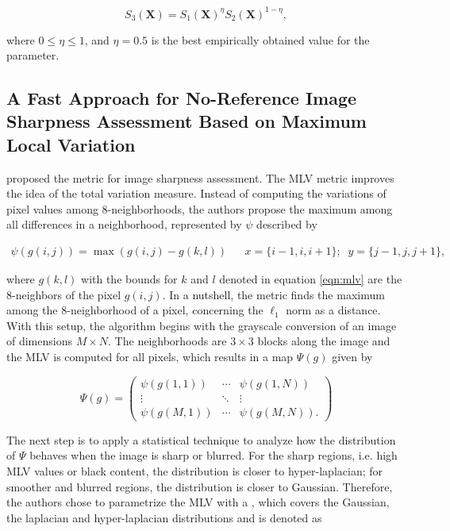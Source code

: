 \begin{equation}
\label{eqn:s3_index}
S_{3}(\mathbf{X}) = S_{1}(\mathbf{X})^{\eta} S_{2}(\mathbf{X})^{1 - \eta},
\end{equation}

\noindent where $0 \leq \eta \leq 1$, and $\eta = 0.5$ is the best empirically obtained value for the parameter.

\subsection{A Fast Approach for No-Reference Image Sharpness Assessment Based on Maximum Local Variation}

 proposed the  metric for image sharpness assessment. The MLV metric improves the idea of the total variation measure. Instead of computing the variations of pixel values among 8-neighborhoods, the authors propose the maximum among all differences in a neighborhood, represented by $\psi$ described by

\begin{align}
\label{eqn:mlv}
\psi(g(i,j)) = \max(g(i,j) - g(k,l))
&&
x = \{i - 1, i, i + 1\};\;\;
y = \{j - 1, j, j + 1\},
\end{align}

\noindent where $g(k,l)$ with the bounds for $k$ and $l$ denoted in equation \ref{eqn:mlv} are the 8-neighbors of the pixel $g(i,j)$. In a nutshell, the metric finds the maximum among the 8-neighborhood of a pixel, concerning the $\ell_{1}$ norm as a distance. With this setup, the algorithm begins with the grayscale conversion of an image of dimensions $M \times N$. The neighborhoods are $3 \times 3$ blocks along the image and the MLV is computed for all pixels, which results in a map $\Psi(g)$ given by

\begin{equation}
\label{eqn:mlv_matrix}
\Psi(g) =
    \begin{pmatrix}
        \psi(g(1,1)) & \cdots &  \psi(g(1,N))\\
        \vdots & \ddots & \vdots\\
        \psi(g(M,1)) & \cdots & \psi(g(M,N)).
    \end{pmatrix}
\end{equation}

\noindent The next step is to apply a statistical technique to analyze how the distribution of $\Psi$ behaves when the image is sharp or blurred. For the sharp regions, i.e. high MLV values or black content, the distribution is closer to hyper-laplacian; for smoother and blurred regions, the distribution is closer to Gaussian. Therefore, the authors chose to parametrize the MLV with a , which covers the Gaussian, the laplacian and hyper-laplacian distributions and is denoted as

